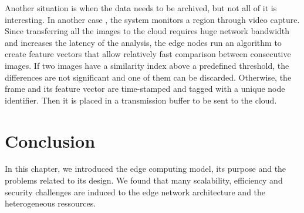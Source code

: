 Another situation is when the data needs to be archived,
but not all of it is interesting.
In another case \cite{ravindran2018edge},
the system monitors a region through video capture.
Since transferring all the images to the cloud requires huge network bandwidth 
and increases the latency of the analysis, the edge nodes run an algorithm to 
create feature vectors that allow relatively fast comparison between consecutive 
images. 
If two images have a similarity index above a predefined threshold, 
the differences are not significant and one of them can be discarded. 
Otherwise, the frame and its feature vector are time-stamped and tagged with a 
unique node identifier. 
Then it is placed in a transmission buffer to be sent to the cloud.

\section{Conclusion}
In this chapter, 
we introduced the edge computing model, its purpose and the problems related to its design.
We found that many scalability, efficiency and security challenges are induced 
to the edge network architecture and the heterogeneous ressources.
